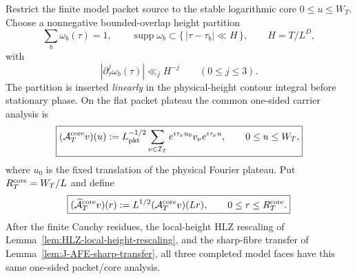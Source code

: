 \begin{proposition}
\label{prop:common-core-congruence}
Restrict the finite model packet source to the stable logarithmic core
$0\le u\le W_T$.  Choose a nonnegative bounded-overlap height partition
\begin{equation}
\boxed{
\sum_b\omega_b(\tau)=1,
\qquad
\operatorname{supp}\omega_b\subset\{\,|\tau-\tau_b|\ll H\,\},
\qquad H=T/L^D,
}
\label{eq:height-principal-partition}
\end{equation}
with
\begin{equation}
\boxed{
|\partial_\tau^j\omega_b(\tau)|\ll_jH^{-j}
\qquad(0\le j\le3).
}
\label{eq:height-partition-derivatives}
\end{equation}
The partition is inserted \emph{linearly} in the physical-height contour
integral before stationary phase.  On the flat packet plateau the common
one-sided carrier analysis is
\begin{equation}
\boxed{
(\mathcal A_T^{\rm core}v)(u)
:=L_{\rm pkt}^{-1/2}\sum_{\nu\in\mathcal I_T}
 e^{i\tau_\nu u_0}v_\nu e^{i\tau_\nu u},
\qquad 0\le u\le W_T,
}
\label{eq:common-core-analysis}
\end{equation}
where $u_0$ is the fixed translation of the physical Fourier plateau.  Put
$R_T^{\rm core}=W_T/L$ and define
\begin{equation}
\boxed{
(\widehat{\mathcal A}_T^{\rm core}v)(r)
:=L^{1/2}(\mathcal A_T^{\rm core}v)(Lr),
\qquad 0\le r\le R_T^{\rm core}.
}
\label{eq:normalized-common-core-analysis}
\end{equation}
After the finite Cauchy residues, the local-height HLZ rescaling of
Lemma~\ref{lem:HLZ-local-height-rescaling}, and the sharp-fibre transfer of
Lemma~\ref{lem:J-AFE-sharp-transfer}, all three completed model faces have this
same one-sided packet/core analysis.


\end{proposition}
